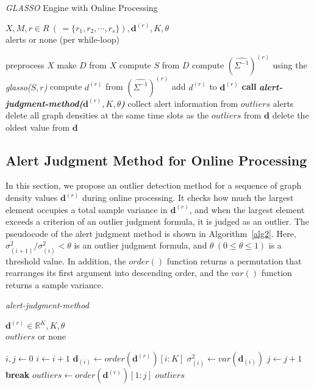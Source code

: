 \documentclass[conference]{IEEEtran}
\begin{document}
\begin{algorithm}[tb]
\caption{\textit{GLASSO} Engine with Online Processing}
\label{alg1}
\begin{algorithmic}[1]
  \REQUIRE $X, M, r \in R \  ( \, = \{r_1, r_2, \cdots, r_s\} ), \bm{d}^{(r)}, K, \theta$\\
  \ENSURE alerts or none (per while-loop)

    \STATE preprocess $X$
    \STATE make $D$ from $X$
    \STATE compute $S$ from $D$
      \STATE compute ${(\hat{\Sigma^{-1}})}^{(r)}$ using the \textit{glasso($S,r$)}
      \STATE compute $d^{(r)}$ from ${(\hat{\Sigma^{-1}})}^{(r)}$
      \STATE add $d^{(r)}$ to $\bm{d}^{(r)}$
        \STATE \textbf{call} \textit{\textbf{alert-judgment-method($\bm{d}^{(r)}, K, \theta$)}}
  		\ENDIF
  	\ENDFOR
      \STATE collect alert information from $outliers$
      \RETURN alerts
      \STATE delete all graph densities at the same time slots as the $outliers$ from $\bm{d}$
    \ELSE
      \STATE delete the oldest value from $\bm{d}$
    \ENDIF
  \ENDWHILE
\end{algorithmic}
\end{algorithm}



\subsection{Alert Judgment Method for Online Processing}
In this section, we propose an outlier detection method for a sequence of graph density values $\bm{d}^{(r)}$ during online processing.
It checks how much the largest element occupies a total sample variance in $\bm{d}^{(r)}$, and when the largest element exceeds a criterion of an outlier judgment formula, it is judged as an outlier.
The pseudocode of the alert judgment method is shown in Algorithm~\ref{alg2}.
Here, $\sigma^{2}_{(i+1)}/\sigma^{2}_{(i)}<\theta$ is an outlier judgment formula, and $\theta \  (0\leq \theta \leq 1)$ is a threshold value.
In addition, the $order()$ function returns a permutation that rearranges its first argument into descending order, and the $var()$ function returns a sample variance.


\begin{algorithm}[tb]
\caption{\textit{alert-judgment-method}}
\label{alg2}
\begin{algorithmic}[1]
  \REQUIRE $\bm{d}^{(r)}\in\mathbb{R}^{K}, K, \theta$\\
  \ENSURE $outliers$ or none

  \STATE $i, j \gets 0$
    \STATE $i \gets i + 1$
    \STATE $\bm{d}_{(i)} \gets order(\bm{d}^{(r)})[i:K]$
    \STATE $\sigma_{(i)}^2 \gets var(\bm{d}_{(i)})$
      \STATE $j \gets j + 1$
      \STATE \textbf{break}
    \ELSE
      \STATE $outliers \gets order(\bm{d}^{(r)})[1:j]$
      \RETURN $outliers$
    \ENDIF
  \ENDWHILE
\end{algorithmic}
\end{algorithm}
\end{document}
